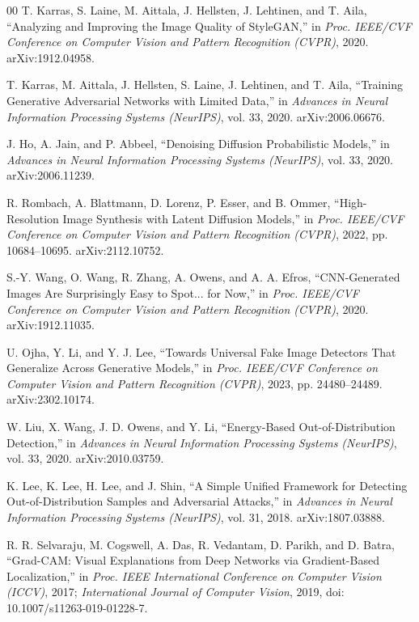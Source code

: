 \documentclass[journal]{IEEEtran}
\begin{document}
\begin{thebibliography}{00}
T. Karras, S. Laine, M. Aittala, J. Hellsten, J. Lehtinen, and T. Aila,
``Analyzing and Improving the Image Quality of StyleGAN,''
in \textit{Proc. IEEE/CVF Conference on Computer Vision and Pattern Recognition (CVPR)}, 2020.
arXiv:1912.04958.

T. Karras, M. Aittala, J. Hellsten, S. Laine, J. Lehtinen, and T. Aila,
``Training Generative Adversarial Networks with Limited Data,''
in \textit{Advances in Neural Information Processing Systems (NeurIPS)}, vol. 33, 2020.
arXiv:2006.06676.

J. Ho, A. Jain, and P. Abbeel,
``Denoising Diffusion Probabilistic Models,''
in \textit{Advances in Neural Information Processing Systems (NeurIPS)}, vol. 33, 2020.
arXiv:2006.11239.

R. Rombach, A. Blattmann, D. Lorenz, P. Esser, and B. Ommer,
``High-Resolution Image Synthesis with Latent Diffusion Models,''
in \textit{Proc. IEEE/CVF Conference on Computer Vision and Pattern Recognition (CVPR)}, 2022, pp. 10684--10695.
arXiv:2112.10752.

S.-Y. Wang, O. Wang, R. Zhang, A. Owens, and A. A. Efros,
``CNN-Generated Images Are Surprisingly Easy to Spot... for Now,''
in \textit{Proc. IEEE/CVF Conference on Computer Vision and Pattern Recognition (CVPR)}, 2020.
arXiv:1912.11035.

U. Ojha, Y. Li, and Y. J. Lee,
``Towards Universal Fake Image Detectors That Generalize Across Generative Models,''
in \textit{Proc. IEEE/CVF Conference on Computer Vision and Pattern Recognition (CVPR)}, 2023, pp. 24480--24489.
arXiv:2302.10174.

W. Liu, X. Wang, J. D. Owens, and Y. Li,
``Energy-Based Out-of-Distribution Detection,''
in \textit{Advances in Neural Information Processing Systems (NeurIPS)}, vol. 33, 2020.
arXiv:2010.03759.

K. Lee, K. Lee, H. Lee, and J. Shin,
``A Simple Unified Framework for Detecting Out-of-Distribution Samples and Adversarial Attacks,''
in \textit{Advances in Neural Information Processing Systems (NeurIPS)}, vol. 31, 2018.
arXiv:1807.03888.

R. R. Selvaraju, M. Cogswell, A. Das, R. Vedantam, D. Parikh, and D. Batra,
``Grad-CAM: Visual Explanations from Deep Networks via Gradient-Based Localization,''
in \textit{Proc. IEEE International Conference on Computer Vision (ICCV)}, 2017;
\textit{International Journal of Computer Vision}, 2019,
doi: 10.1007/s11263-019-01228-7.


\end{thebibliography}
\end{document}
